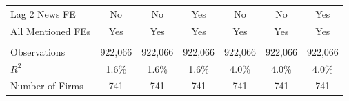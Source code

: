\documentclass[border=0.2cm]{standalone}
\begin{document}
\begin{tabular}{lcccccc}
    Lag 2 News FE     & No                                             & No                                             & Yes                                            & No                                             & No                                             & Yes                                            \\
    All Mentioned FEs & Yes                                            & Yes                                            & Yes                                            & Yes                                            & Yes                                            & Yes                                            \\
    \vspace{4pt}      & \begin{footnotesize}\end{footnotesize}         & \begin{footnotesize}\end{footnotesize}         & \begin{footnotesize}\end{footnotesize}         & \begin{footnotesize}\end{footnotesize}         & \begin{footnotesize}\end{footnotesize}         & \begin{footnotesize}\end{footnotesize}         \\
    Observations      & 922,066                                        & 922,066                                        & 922,066                                        & 922,066                                        & 922,066                                        & 922,066                                        \\
    $R^2$             & 1.6\%                                          & 1.6\%                                          & 1.6\%                                          & 4.0\%                                          & 4.0\%                                          & 4.0\%                                          \\
    Number of Firms   & 741                                            & 741                                            & 741                                            & 741                                            & 741                                            & 741                                            \\ 

\end{tabular}
\end{document}
